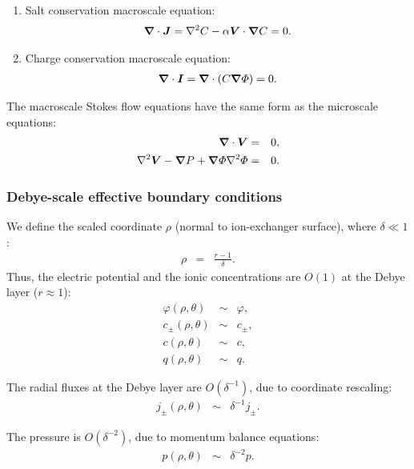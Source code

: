 \begin{enumerate}
\item Salt conservation macroscale equation:
\begin{eqnarray}
\boldsymbol{\nabla} \cdot \boldsymbol{J} = \nabla^2 C - \alpha \boldsymbol{V} \cdot \boldsymbol{\nabla} C = 0. 
\end{eqnarray}

\item Charge conservation macroscale equation:
\begin{eqnarray}
\boldsymbol{\nabla} \cdot \boldsymbol{I} = \boldsymbol{\nabla} \cdot \left( C \boldsymbol{\nabla} \varPhi \right) = 0.
\end{eqnarray}
\end{enumerate}

The macroscale Stokes flow equations have the same form as the microscale equations:
\begin{eqnarray}
\boldsymbol{\nabla} \cdot \boldsymbol{V} &=& 0, \\
\nabla^2 \boldsymbol{V} - \boldsymbol{\nabla} P + \boldsymbol{\nabla} \varPhi \nabla^2 \varPhi &=& 0.
\end{eqnarray}

\subsubsection{Debye-scale effective boundary conditions}
We define the scaled coordinate $\rho$ (normal to ion-exchanger surface), where $\delta \ll 1$:
\begin{eqnarray}
  \rho &=& \frac{r-1}{\delta}. 
\end{eqnarray}
Thus, the electric potential and the ionic concentrations are $O(1)$ at the Debye layer ($r \approx 1$):
\begin{eqnarray}
  \varphi(\rho,\theta) &\sim& \varphi, \\
  c_\pm(\rho,\theta) &\sim& c_\pm, \\
  c(\rho,\theta) &\sim& c, \\
  q(\rho,\theta) &\sim& q.
\end{eqnarray}

The radial fluxes at the Debye layer are $O(\delta^{-1})$, due to coordinate rescaling:
\begin{eqnarray}
  j_\pm(\rho, \theta) &\sim& \delta^{-1} j_\pm.
\end{eqnarray}

The pressure is $O(\delta^{-2})$, due to momentum balance equations:
\begin{eqnarray}
  p(\rho, \theta) &\sim& \delta^{-2} p.
\end{eqnarray}

